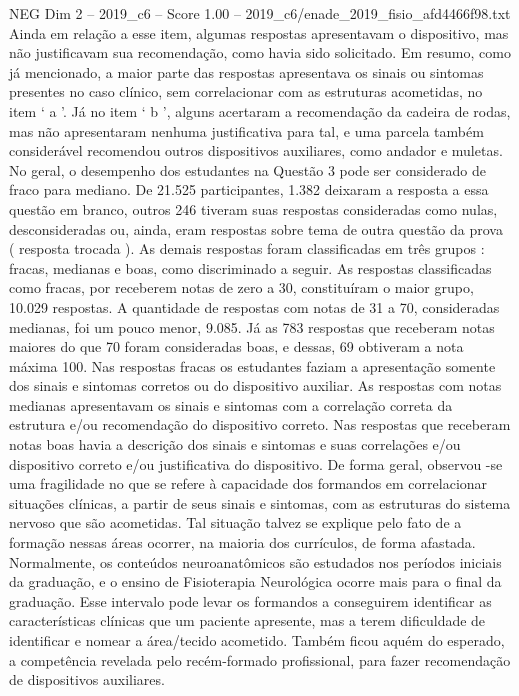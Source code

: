 \begin{textsample}{NEG Dim 2 – 2019\_c6 – Score 1.00 – 2019\_c6/enade\_2019\_fisio\_afd4466f98.txt}
Ainda em relação a esse item, algumas respostas apresentavam o dispositivo, mas não justificavam sua recomendação, como havia sido solicitado.
Em resumo, como já mencionado, a maior parte das respostas apresentava os sinais ou sintomas presentes no caso clínico, sem correlacionar com as estruturas acometidas, no item ‘ a ’.
Já no item ‘ b ’, alguns acertaram a recomendação da cadeira de rodas, mas não apresentaram nenhuma justificativa para tal, e uma parcela também considerável recomendou outros dispositivos auxiliares, como andador e muletas.
No geral, o desempenho dos estudantes na Questão 3 pode ser considerado de fraco para mediano.
De 21.525 participantes, 1.382 deixaram a resposta a essa questão em branco, outros 246 tiveram suas respostas consideradas como nulas, desconsideradas ou, ainda, eram respostas sobre tema de outra questão da prova ( resposta trocada ).
As demais respostas foram classificadas em três grupos : fracas, medianas e boas, como discriminado a seguir.
As respostas classificadas como fracas, por receberem notas de zero a 30, constituíram o maior grupo, 10.029 respostas.
A quantidade de respostas com notas de 31 a 70, consideradas medianas, foi um pouco menor, 9.085.
Já as 783 respostas que receberam notas maiores do que 70 foram consideradas boas, e dessas, 69 obtiveram a nota máxima 100.
Nas respostas fracas os estudantes faziam a apresentação somente dos sinais e sintomas corretos ou do dispositivo auxiliar.
As respostas com notas medianas apresentavam os sinais e sintomas com a correlação correta da estrutura e/ou recomendação do dispositivo correto.
Nas respostas que receberam notas boas havia a descrição dos sinais e sintomas e suas correlações e/ou dispositivo correto e/ou justificativa do dispositivo.
De forma geral, observou -se uma fragilidade no que se refere à capacidade dos formandos em correlacionar situações clínicas, a partir de seus sinais e sintomas, com as estruturas do sistema nervoso que são acometidas.
Tal situação talvez se explique pelo fato de a formação nessas áreas ocorrer, na maioria dos currículos, de forma afastada.
Normalmente, os conteúdos neuroanatômicos são estudados nos períodos iniciais da graduação, e o ensino de Fisioterapia Neurológica ocorre mais para o final da graduação.
Esse intervalo pode levar os formandos a conseguirem identificar as características clínicas que um paciente apresente, mas a terem dificuldade de identificar e nomear a área/tecido acometido.
Também ficou aquém do esperado, a competência revelada pelo recém-formado profissional, para fazer recomendação de dispositivos auxiliares.

\end{textsample}
